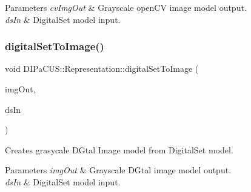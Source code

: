 \begin{DoxyParams}{Parameters}
{\em cv\+Img\+Out} & Grayscale open\+CV image model output. \\
\hline
{\em ds\+In} & Digital\+Set model input. \\
\hline
\end{DoxyParams}
\mbox{\label{namespaceDIPaCUS_1_1Representation_a41889947a0233ac7c4433140f2d8886a}} 
\subsubsection{\texorpdfstring{digital\+Set\+To\+Image()}{digitalSetToImage()}}
{\footnotesize\ttfamily void D\+I\+Pa\+C\+U\+S\+::\+Representation\+::digital\+Set\+To\+Image (\begin{DoxyParamCaption}\item[{\mbox{\hyperlink{namespaceDIPaCUS_1_1Representation_ae97917e89f57298fda1626daad9f1733}{Image2D}} \&}]{img\+Out,  }\item[{const \mbox{\hyperlink{namespaceDIPaCUS_1_1Representation_a6eca0b4fa262f2d600f11d82ee10b5a6}{Digital\+Set}} \&}]{ds\+In }\end{DoxyParamCaption})}



Creates grasycale D\+Gtal Image model from Digital\+Set model. 


\begin{DoxyParams}{Parameters}
{\em img\+Out} & Grayscale D\+Gtal image model output. \\
\hline
{\em ds\+In} & Digital\+Set model input. \\
\hline
\end{DoxyParams}
\mbox{\label{namespaceDIPaCUS_1_1Representation_a2b07e44f7c61b0a3b971cbda49aa0d88}} 
